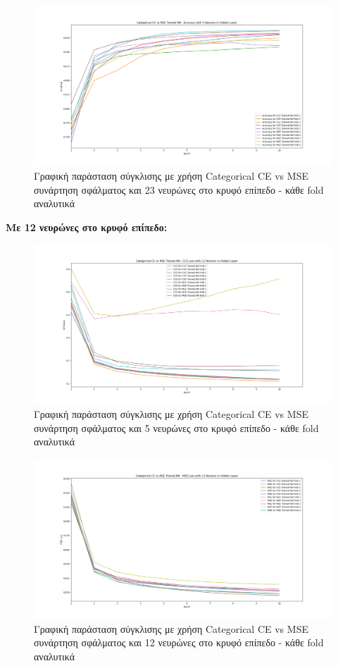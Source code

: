 \documentclass[12pt,a4paper]{article}
\begin{document}
\begin{figure}[H]
	\includegraphics[width=\textwidth]{3. CCE vs MSE - Accuracy - 5 Neurons.png}
	\caption{Γραφική παράσταση σύγκλισης με χρήση Categorical CE vs MSE συνάρτηση σφάλματος και 23 νευρώνες στο κρυφό επίπεδο - κάθε fold αναλυτικά}
\end{figure}

\textbf{Με 12 νευρώνες στο κρυφό επίπεδο:}

\begin{figure}[H]
	\includegraphics[width=\textwidth]{4. CCE vs MSE - CCE Loss - 12 Neurons.png}
	\caption{Γραφική παράσταση σύγκλισης με χρήση Categorical CE vs MSE συνάρτηση σφάλματος και 5 νευρώνες στο κρυφό επίπεδο - κάθε fold αναλυτικά}
\end{figure}

\begin{figure}[H]
	\includegraphics[width=\textwidth]{5. CCE vs MSE - MSE Loss - 12 Neurons.png}
	\caption{Γραφική παράσταση σύγκλισης με χρήση Categorical CE vs MSE συνάρτηση σφάλματος και 12 νευρώνες στο κρυφό επίπεδο - κάθε fold αναλυτικά}
\end{figure}
\end{document}

